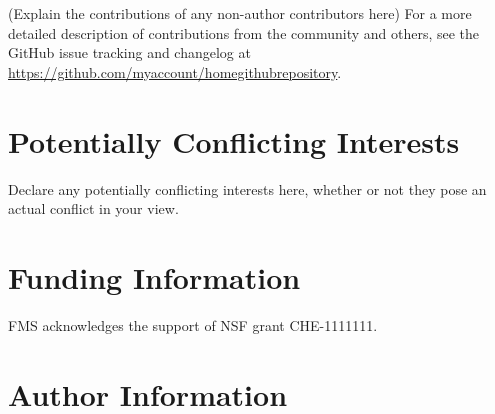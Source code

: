 \documentclass[9pt,tutorial]{livecoms}
\newcommand{\githubrepository}{\url{https://github.com/myaccount/homegithubrepository}}  %
\begin{document}
(Explain the contributions of any non-author contributors here)
For a more detailed description of contributions from the community and others, see the GitHub issue tracking and changelog at \githubrepository.

\section*{Potentially Conflicting Interests}

Declare any potentially conflicting interests here, whether or not they pose an actual conflict in your view.

\section*{Funding Information}
FMS acknowledges the support of NSF grant CHE-1111111.

\section*{Author Information}
\makeorcid




\end{document}
